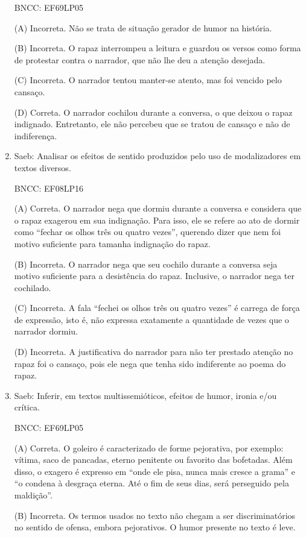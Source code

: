 \begin{enumerate}
BNCC: EF69LP05

(A) Incorreta. Não se trata de situação gerador de humor na história.

(B) Incorreta. O rapaz interrompeu a leitura e guardou os versos como
forma de protestar contra o narrador, que não lhe deu a atenção
desejada.

(C) Incorreta. O narrador tentou manter-se atento, mas foi vencido pelo
cansaço.

(D) Correta. O narrador cochilou durante a conversa, o que deixou o
rapaz indignado. Entretanto, ele não percebeu que se tratou de cansaço e
não de indiferença.


\item

Saeb: Analisar os efeitos de sentido produzidos pelo uso de
modalizadores em textos diversos.

BNCC: EF08LP16

(A) Correta. O narrador nega que dormiu durante a conversa e considera
que o rapaz exagerou em sua indignação. Para isso, ele se refere ao ato
de dormir como ``fechar os olhos três ou quatro vezes'', querendo dizer
que nem foi motivo suficiente para tamanha indignação do rapaz.

(B) Incorreta. O narrador nega que seu cochilo durante a conversa seja
motivo suficiente para a desistência do rapaz. Inclusive, o narrador
nega ter cochilado.

(C) Incorreta. A fala ``fechei os olhos três ou quatro vezes'' é carrega
de força de expressão, isto é, não expressa exatamente a quantidade de
vezes que o narrador dormiu.

(D) Incorreta. A justificativa do narrador para não ter prestado atenção
no rapaz foi o cansaço, pois ele nega que tenha sido indiferente ao
poema do rapaz.


\item

Saeb: Inferir, em textos multissemióticos, efeitos de humor, ironia e/ou
crítica.

BNCC: EF69LP05

(A) Correta. O goleiro é caracterizado de forme pejorativa, por exemplo:
vítima, saco de pancadas, eterno penitente ou favorito das bofetadas.
Além disso, o exagero é expresso em ``onde ele pisa, nunca mais cresce a
grama'' e ``o condena à desgraça eterna. Até o fim de seus dias, será
perseguido pela maldição''.

(B) Incorreta. Os termos usados no texto não chegam a ser
discriminatórios no sentido de ofensa, embora pejorativos. O humor
presente no texto é leve.


\end{enumerate}
